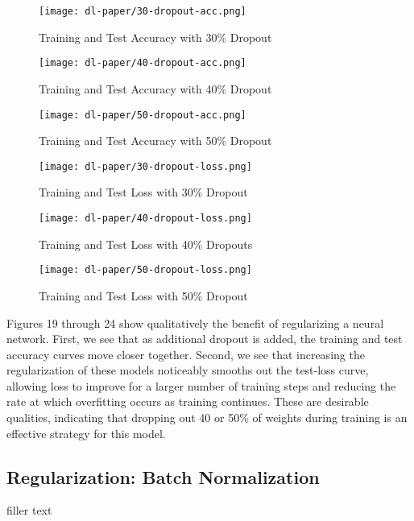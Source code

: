 \documentclass[12pt]{article}  %
\theoremstyle{definition}
\theoremstyle{remark}
\begin{document}
\begin{figure}[!htb]
  \texttt{[image: dl-paper/30-dropout-acc.png]}
  \caption{Training and Test Accuracy with 30\% Dropout}\label{30-drop}
\endminipage\hfill
{}
  \texttt{[image: dl-paper/40-dropout-acc.png]}
  \caption{Training and Test Accuracy with 40\% Dropout}\label{40-drop}
\endminipage\hfill
{}%
  \texttt{[image: dl-paper/50-dropout-acc.png]}
  \caption{Training and Test Accuracy with 50\% Dropout}\label{50-drop}
\endminipage
\end{figure}


\begin{figure}[!htb]
  \texttt{[image: dl-paper/30-dropout-loss.png]}
  \caption{Training and Test Loss with 30\% Dropout}\label{30-drop-loss}
\endminipage\hfill
{}
  \texttt{[image: dl-paper/40-dropout-loss.png]}
  \caption{Training and Test Loss with 40\% Dropouts}\label{40-drop-loss}
\endminipage\hfill
{}%
  \texttt{[image: dl-paper/50-dropout-loss.png]}
  \caption{Training and Test Loss with 50\% Dropout}\label{50-drop-loss}
\endminipage
\end{figure}

\par Figures 19 through 24 show qualitatively the benefit of regularizing a neural network. First, we see that as additional dropout is added, the training and test accuracy curves move closer together. Second, we see that increasing the regularization of these models noticeably smooths out the test-loss curve, allowing loss to improve for a larger number of training steps and reducing the rate at which overfitting occurs as training continues. These are desirable qualities, indicating that dropping out 40 or 50\% of weights during training is an effective strategy for this model. 


\subsection{Regularization: Batch Normalization}
\par filler text
\end{document}
